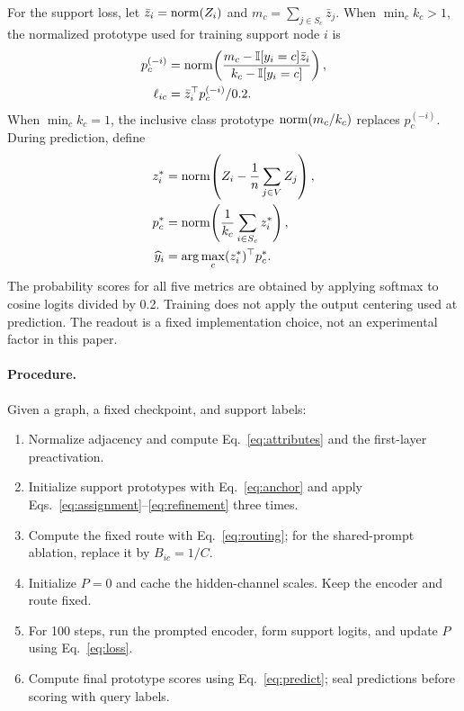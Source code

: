 For the support loss, let $\bar z_i=\operatorname{norm}\!\left(Z_i\right)$ and $m_c=\sum_{j\in S_c}\bar z_j$. When $\min_c k_c>1$, the normalized prototype used for training support node $i$ is
\begin{equation}
\begin{aligned}
p_c^{(-i)}&=\operatorname{norm}\!\left(\frac{m_c-\mathbb I[y_i=c]\bar z_i}{k_c-\mathbb I[y_i=c]}\right),\\
\ell_{ic}&=\bar z_i^\top p_c^{(-i)}/0.2.
\end{aligned}
\label{eq:loo}
\end{equation}
When $\min_c k_c=1$, the inclusive class prototype $\operatorname{norm}\!\left(m_c/k_c\right)$ replaces $p_c^{(-i)}$. During prediction, define
\begin{equation}
\begin{aligned}
z_i^*&=\operatorname{norm}\!\left(Z_i-\frac1n\sum_{j\in V}Z_j\right),\\
p_c^*&=\operatorname{norm}\!\left(\frac1{k_c}\sum_{i\in S_c}z_i^*\right),\\
\widehat y_i&=\arg\max_c (z_i^*)^\top p_c^*.
\end{aligned}
\label{eq:predict}
\end{equation}
The probability scores for all five metrics are obtained by applying softmax to cosine logits divided by 0.2. Training does not apply the output centering used at prediction. The readout is a fixed implementation choice, not an experimental factor in this paper.

\paragraph{Procedure.}
Given a graph, a fixed checkpoint, and support labels:
\begin{enumerate}
\item Normalize adjacency and compute Eq.~\eqref{eq:attributes} and the first-layer preactivation.
\item Initialize support prototypes with Eq.~\eqref{eq:anchor} and apply Eqs.~\eqref{eq:assignment}--\eqref{eq:refinement} three times.
\item Compute the fixed route with Eq.~\eqref{eq:routing}; for the shared-prompt ablation, replace it by $B_{ic}=1/C$.
\item Initialize $P=0$ and cache the hidden-channel scales. Keep the encoder and route fixed.
\item For 100 steps, run the prompted encoder, form support logits, and update $P$ using Eq.~\eqref{eq:loss}.
\item Compute final prototype scores using Eq.~\eqref{eq:predict}; seal predictions before scoring with query labels.
\end{enumerate}

